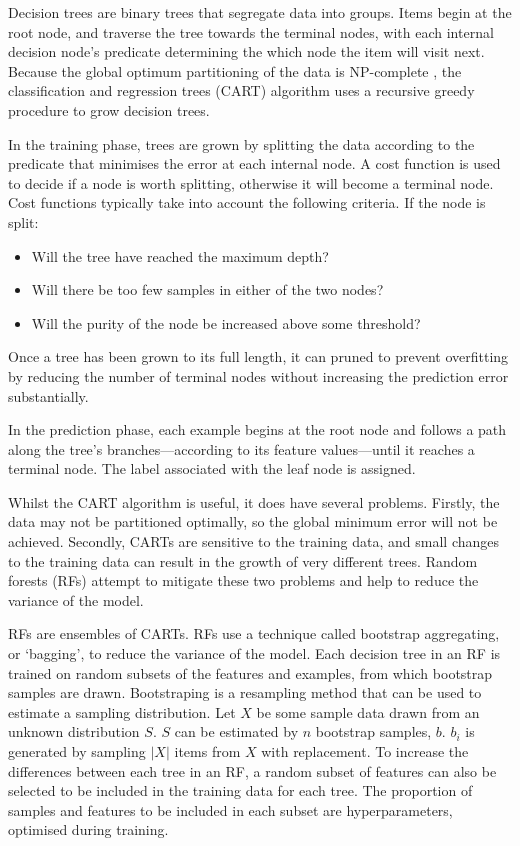Decision trees are binary trees that segregate data into groups. Items begin at the root node, and traverse the tree towards the terminal nodes, with each internal decision node’s predicate determining the which node the item will visit next. Because the global optimum partitioning of the data is NP-complete \cite{hyafil1976constructing}, the classification and regression trees (CART) algorithm uses a recursive greedy procedure to grow decision trees.

In the training phase, trees are grown by splitting the data according to the predicate that minimises the error at each internal node. A cost function is used to decide if a node is worth splitting, otherwise it will become a terminal node. Cost functions typically take into account the following criteria. If the node is split:
\begin{itemize}
    \item Will the tree have reached the maximum depth?
    \item Will there be too few samples in either of the two nodes?
    \item Will the purity of the node be increased above some threshold?
\end{itemize}
Once a tree has been grown to its full length, it can pruned to prevent overfitting by reducing the number of terminal nodes without increasing the prediction error substantially. 

In the prediction phase, each example begins at the root node and follows a path along the tree’s branches—according to its feature values—until it reaches a terminal node. The label associated with the leaf node is assigned.

Whilst the CART algorithm is useful, it does have several problems. Firstly, the data may not be partitioned optimally, so the global minimum error will not be achieved. Secondly, CARTs are sensitive to the training data, and small changes to the training data can result in the growth of very different trees. Random forests (RFs) attempt to mitigate these two problems and help to reduce the variance of the model.

RFs are ensembles of CARTs. RFs use a technique called bootstrap aggregating, or `bagging', to reduce the variance of the model. Each decision tree in an RF is trained on random subsets of the features and examples, from which bootstrap samples are drawn. Bootstraping is a resampling method that can be used to estimate a sampling distribution. Let $X$ be some sample data drawn from an unknown distribution $S$. $S$ can be estimated by $n$ bootstrap samples, $b$. $b_i$ is generated by sampling $|X|$ items from $X$ with replacement. To increase the differences between each tree in an RF, a random subset of features can also be selected to be included in the training data for each tree. The proportion of samples and features to be included in each subset are hyperparameters, optimised during training.

